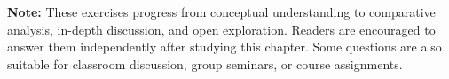 \noindent\textbf{Note:}
These exercises progress from conceptual understanding to comparative analysis,
in-depth discussion, and open exploration. Readers are encouraged to answer them
independently after studying this chapter. Some questions are also suitable for
classroom discussion, group seminars, or course assignments.